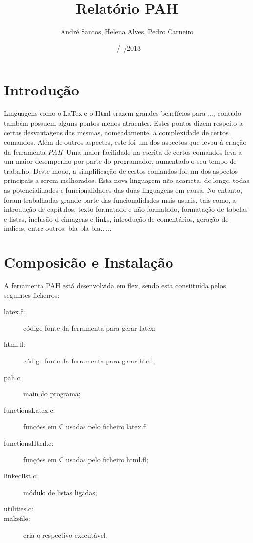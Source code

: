 \documentclass[11pt,a4paper]{article}
\begin{document}
\title{ Relatório PAH }
\author{ André Santos, Helena Alves, Pedro Carneiro }
\date{ --/--/2013 }




\maketitle
\newpage
\tableofcontents
\newpage


 
\section{Introdução}
Linguagens como o LaTex e o Html trazem grandes benefícios para ..., contudo também possuem alguns pontos menos atraentes. Estes pontos dizem respeito a certas desvantagens das mesmas, nomeadamente, a complexidade de certos comandos. Além de outros aspectos, este foi um dos aspectos que levou à criação da ferramenta \textit{PAH}. Uma maior facilidade na escrita de certos comandos leva a um maior desempenho por parte do programador, aumentado o seu tempo de trabalho. Deste modo, a simplificação de certos comandos foi um dos aspectos principais a serem melhorados. 
Esta nova linguagem não acarreta, de longe, todas as potencialidades e funcionalidades das duas linguagens em causa. No entanto, foram trabalhadas grande parte das funcionalidades mais usuais, tais como, a introdução de capítulos, texto formatado e não formatado, formatação de tabelas e listas, inclusão d eimagens e links, introdução de comentários, geração de índices, entre outros. bla bla bla......


 \newpage 
\section{Composicão e Instalação}
A ferramenta PAH está desenvolvida em flex, sendo esta constituída pelos seguintes ficheiros:

\begin{description}
    \item[latex.fl:] código fonte da ferramenta para gerar latex;
    \item[html.fl:] código fonte da ferramenta para gerar html;
    \item[pah.c:] main do programa;
    \item[functionsLatex.c:] funções em C usadas pelo ficheiro latex.fl;
    \item[functionsHtml.c:] funções em C usadas pelo ficheiro html.fl;
    \item[linkedlist.c:] módulo de listas ligadas;
    \item[utilities.c:] 
    \item[makefile:] cria o respectivo executável.
\end{description}
 
\end{document}
